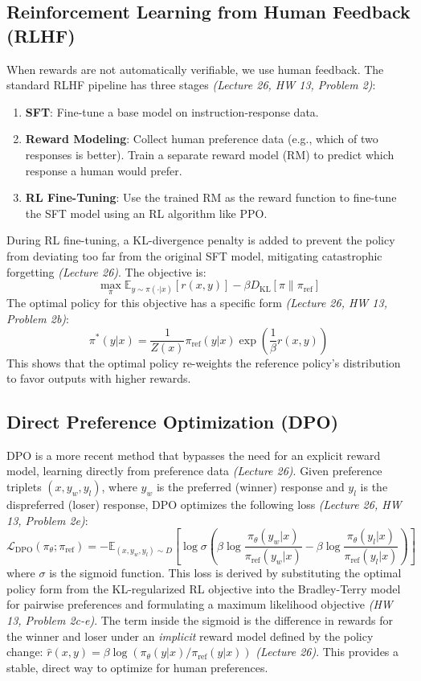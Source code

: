 \documentclass[11pt]{article}
\newcommand{\E}{\mathbb{E}}
\newcommand{\KL}{\text{KL}}
\begin{document}
\subsection{Reinforcement Learning from Human Feedback (RLHF)}
When rewards are not automatically verifiable, we use human feedback. The standard RLHF pipeline has three stages \textit{(Lecture 26, HW 13, Problem 2)}:
\begin{enumerate}
    \item \textbf{SFT}: Fine-tune a base model on instruction-response data.
    \item \textbf{Reward Modeling}: Collect human preference data (e.g., which of two responses is better). Train a separate reward model (RM) to predict which response a human would prefer.
    \item \textbf{RL Fine-Tuning}: Use the trained RM as the reward function to fine-tune the SFT model using an RL algorithm like PPO.
\end{enumerate}
During RL fine-tuning, a KL-divergence penalty is added to prevent the policy from deviating too far from the original SFT model, mitigating catastrophic forgetting \textit{(Lecture 26)}. The objective is:
\[ \max_{\pi} \E_{y \sim \pi(\cdot|x)} [r(x,y)] - \beta D_{\KL}[\pi \| \pi_{\text{ref}}] \]
The optimal policy for this objective has a specific form \textit{(Lecture 26, HW 13, Problem 2b)}:
\[ \pi^*(y|x) = \frac{1}{Z(x)} \pi_{\text{ref}}(y|x) \exp\left(\frac{1}{\beta} r(x,y)\right) \]
This shows that the optimal policy re-weights the reference policy's distribution to favor outputs with higher rewards.

\subsection{Direct Preference Optimization (DPO)}
DPO is a more recent method that bypasses the need for an explicit reward model, learning directly from preference data \textit{(Lecture 26)}. Given preference triplets $(x, y_w, y_l)$, where $y_w$ is the preferred (winner) response and $y_l$ is the dispreferred (loser) response, DPO optimizes the following loss \textit{(Lecture 26, HW 13, Problem 2e)}:
\[ \mathcal{L}_{\text{DPO}}(\pi_{\theta}; \pi_{\text{ref}}) = -\E_{(x, y_w, y_l) \sim D} \left[ \log \sigma \left( \beta \log \frac{\pi_{\theta}(y_w|x)}{\pi_{\text{ref}}(y_w|x)} - \beta \log \frac{\pi_{\theta}(y_l|x)}{\pi_{\text{ref}}(y_l|x)} \right) \right] \]
where $\sigma$ is the sigmoid function. This loss is derived by substituting the optimal policy form from the KL-regularized RL objective into the Bradley-Terry model for pairwise preferences and formulating a maximum likelihood objective \textit{(HW 13, Problem 2c-e)}. The term inside the sigmoid is the difference in rewards for the winner and loser under an \textit{implicit} reward model defined by the policy change: $\hat{r}(x, y) = \beta \log(\pi_\theta(y|x) / \pi_{\text{ref}}(y|x))$ \textit{(Lecture 26)}. This provides a stable, direct way to optimize for human preferences.
\end{document}
